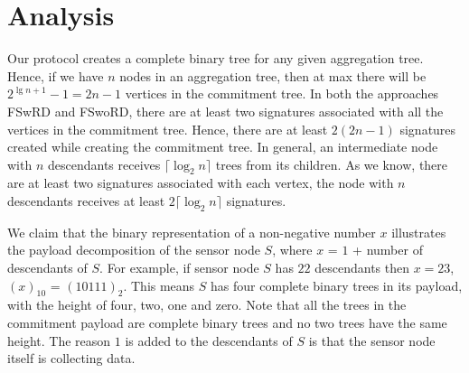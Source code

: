 		
	\section{Analysis}

		Our protocol creates a complete binary tree for any given aggregation tree.
		Hence, if we have $n$ nodes in an aggregation tree, then at max there will be $2^{\lg n + 1} - 1 = 2n-1$ vertices in the commitment tree.
		In both the approaches FSwRD and FSwoRD, there are at least two signatures associated with all the vertices in the commitment tree.
		Hence, there are at least $2(2n-1)$ signatures created while creating the commitment tree.
		In general, an intermediate node with $n$ descendants receives $\lceil \log_2 n \rceil$ trees from its children.
		As we know, there are at least two signatures associated with each vertex, the node with $n$ descendants receives at least $2 \lceil \log_2 n \rceil $ signatures.

		We claim that the binary representation of a non-negative number $x$ illustrates the payload decomposition of the sensor node $S$, where $x$ = $1$ + number of descendants of $S$.
		For example, if sensor node $S$ has $22$ descendants then $x =23$, $(x)_{10}$ = $(10111)_{2}$. 
		This means $S$ has four complete binary trees in its payload, with the height of four, two, one and zero.
		Note that all the trees in the commitment payload are complete binary trees and no two trees have the same height.
		The reason $1$ is added to the descendants of $S$ is that the sensor node itself is collecting data.

